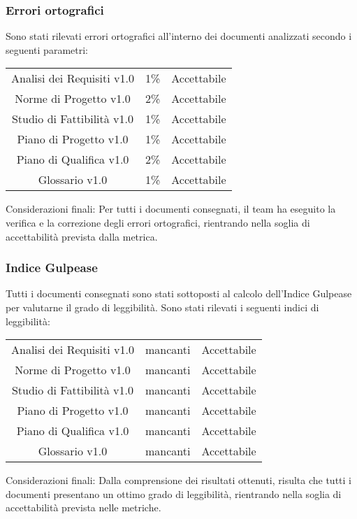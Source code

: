 \subsubsection{Errori ortografici}
Sono stati rilevati errori ortografici all'interno dei documenti analizzati secondo i seguenti parametri:

{
	\centering
	\begin{tabular}{| c | C{1cm} | C{3cm} |}
		Analisi dei Requisiti v1.0 & 1\% & Accettabile \\
		Norme di Progetto v1.0 & 2\% & Accettabile\\
		Studio di Fattibilità v1.0 & 1\% &  Accettabile \\
		Piano di Progetto v1.0 & 1\% & Accettabile \\
		Piano di Qualifica v1.0 & 2\% & Accettabile\\
		Glossario v1.0 & 1\% & Accettabile\\
	\end{tabular}
}

    Considerazioni finali: Per tutti i documenti consegnati, il team ha eseguito la verifica e la correzione degli errori ortografici, rientrando nella soglia di accettabilità prevista dalla metrica.

\subsubsection{Indice Gulpease}

Tutti i documenti consegnati sono stati sottoposti al calcolo dell'Indice Gulpease per valutarne il grado di leggibilità.
Sono stati rilevati i seguenti indici di leggibilità:

{
	\centering
	\begin{tabular}{| c | C{3cm} | C{3cm} |}
		Analisi dei Requisiti v1.0 &  mancanti & Accettabile \\
		Norme di Progetto v1.0 & mancanti & Accettabile\\
		Studio di Fattibilità v1.0 & mancanti & Accettabile\\ 
		Piano di Progetto v1.0 & mancanti & Accettabile \\
		Piano di Qualifica v1.0 & mancanti & Accettabile\\
		Glossario v1.0 & mancanti & Accettabile\\
	 \end{tabular}
}

	Considerazioni finali: Dalla comprensione dei risultati ottenuti, risulta che tutti i documenti presentano un ottimo grado di leggibilità, rientrando nella soglia di accettabilità prevista nelle metriche.

